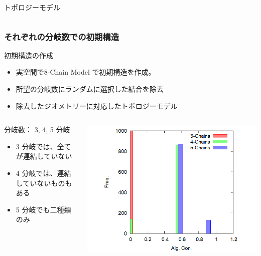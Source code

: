 \documentclass[aspectratio=169,11pt, dvipdfmx]{beamer}
\begin{document}
\begin{frame}
\begin{columns}[totalwidth=\textwidth]
\begin{exampleblock}{トポロジーモデル}
			\end{exampleblock}
		\end{columns}
\end{frame}

\begin{frame}
	\frametitle{それぞれの分岐数での初期構造}
		\begin{exampleblock}{初期構造の作成}
			\begin{itemize}
				\item \alert{実空間}で8-Chain Model で初期構造を作成。
				\item 所望の分岐数に\alert{ランダム}に選択した\alert{結合を除去}
				\item 除去したジオメトリーに対応した\alert{トポロジーモデル}
			\end{itemize}
		\end{exampleblock}
		\begin{columns}[totalwidth=\linewidth]
				\begin{block}{分岐数： 3, 4, 5 分岐}
					\begin{itemize}
						\item 3 分岐では、全てが連結していない
						\item 4 分岐では、連結していないものもある
						\item 5 分岐でも二種類のみ
					\end{itemize}
				\end{block}
				\includegraphics[width=.8\columnwidth]{Histgram2.png}
		\end{columns}
\end{frame}
\end{document}
